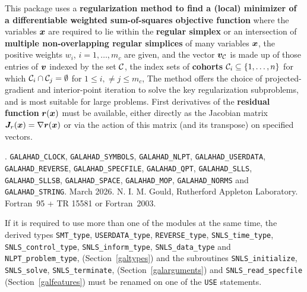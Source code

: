 \documentclass{galahad}
\newcommand{\packagename}{SNLS}
\newcommand{\fullpackagename}{\libraryname\_\packagename}
\begin{document}
\galheader


\galsummary
This package uses a {\bf regularization method to find a (local)
minimizer of a differentiable weighted sum-of-squares objective function}
where the variables ${\bm{x}}$ are required to lie within the
{\bf regular simplex}
or an intersection of {\bf multiple non-overlapping regular simplices}
of many variables ${\bm{x}}$,
the positive weights $w_i$, $i=1,\ldots,m_c$ are given, and
the vector $\bmv_{\calC}$ is made up of those entries of ${\bm{v}}$ indexed by
the set $\calC$, 
the index sets of {\bf cohorts} $\calC_i \subseteq \{1,\ldots,n\}$
for which $\calC_i \cap \calC_j = \emptyset$ for $1 \leq i, \neq j \leq m_c$,
The method offers the choice of projected-gradient and interior-point
iteration to solve the key regularization subproblems,
and is most suitable for large problems.
First derivatives of the {\bf residual function}
${\bm{r}}({\bm{x}})$ must be available, either directly as the Jacobian matrix 
${\bm{J}}_r({\bm{x}}) = \nabla {\bm{r}}({\bm{x}})$ or via the action of this matrix
(and its transpose) on specified vectors.


\galattributes
\galversions{\tt  \fullpackagename\_single, \fullpackagename\_double}.
\galuses
{\tt GALAHAD\_CLOCK},
{\tt GALAHAD\_SY\-M\-BOLS},
{\tt GALAHAD\_NLPT},
{\tt GALAHAD\_USERDATA},
{\tt GALAHAD\_REVERSE},
{\tt GALAHAD\_SPECFILE},
{\tt GALAHAD\_QPT},
{\tt GALAHAD\_SLLS},
{\tt GALAHAD\_SLLSB},
{\tt GALAHAD\_\-SPACE},
{\tt GALAHAD\_MOP},
{\tt GALAHAD\_NORMS}
and
{\tt GALAHAD\_STRING}.
\galdate March 2026.
\galorigin N. I. M. Gould, Rutherford Appleton Laboratory.
\gallanguage Fortran~95 + TR 15581 or Fortran~2003.


\galhowto



\noindent
If it is required to use more than one of the modules at the same time, 
the derived types
{\tt SMT\_type},
{\tt USERDATA\_type},
{\tt REVERSE\_type},
{\tt \packagename\_time\_\-type},
{\tt \packagename\_control\_type},
{\tt \packagename\_inform\_type},
{\tt \packagename\_data\_type}
and
{\tt NLPT\_problem\_\-type},
(Section~\ref{galtypes})
and the subroutines
{\tt \packagename\_initialize},
{\tt \packagename\_\-solve},
{\tt \packagename\_terminate},
(Section~\ref{galarguments})
and
{\tt \packagename\_\-read\_specfile}
(Section~\ref{galfeatures})
must be renamed on one of the {\tt USE} statements.
\end{document}
